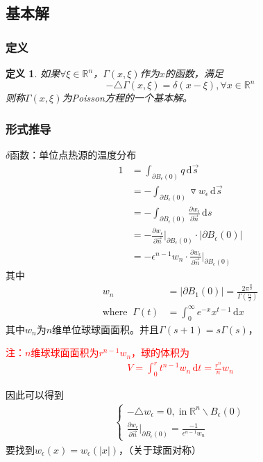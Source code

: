 \documentclass[11pt, a4paper]{article}
\theoremstyle{theorem}
\newtheorem{definition}[thm]{定义}
\newcommand{\intd}[1]{\,\mathrm{d}{#1}}
\begin{document}
\subsection{基本解}

\subsubsection{定义}

\begin{definition}
    如果$\forall \xi \in \mathbb{R}^n$，$\Gamma(x,\xi)$作为$x$的函数，满足
    $$
    - \triangle \Gamma(x,\xi) = \delta(x - \xi), \forall x \in \mathbb{R}^n
    $$
    则称$\Gamma(x,\xi)$为Poisson方程的一个基本解。
\end{definition}

\subsubsection{形式推导}

$\delta$函数：单位点热源的温度分布
\begin{align*}
    1
    &= \int_{\partial B_\epsilon(0)} q \, \mathrm{d} \vec{s} \\
    &= - \int_{\partial B_\epsilon(0)} \triangledown w_\epsilon \, \mathrm{d} \vec{s} \\
    &= - \int_{\partial B_\epsilon(0)} \frac{\partial w_\epsilon}{\partial \vec{n}} \intd s \\
    &= - \frac{\partial w_\epsilon}{\partial \vec{n}} \bigg|_{\partial B_\epsilon(0)} \cdot \left| \partial B_\epsilon(0)\right| \\
    &= - \epsilon^{n-1} w_n \cdot \frac{\partial w_\epsilon}{\partial \vec{n}} \bigg|_{\partial B_\epsilon(0)}
\end{align*}
其中
\begin{align*}
w_n &= |\partial B_1(0)| = \frac{2 \pi^{\frac{n}{2}}}{\Gamma(\frac{n}{2})} \\
\text{where} \; \; \Gamma(t) &= \int_0^\infty e^{-x} x^{t-1} \intd x
\end{align*}
其中$w_n$为$n$维单位球球面面积。并且$\Gamma(s+1) = s \Gamma(s)$，

\textcolor{red}{注：$n$维球球面面积为$r^{n-1} w_n$，球的体积为
\begin{align}
    V = \int_0^r t^{n-1} w_n \intd t = \frac{r^n}{n} w_n
\end{align}
}

因此可以得到
\begin{align}
    \label{Q5-1-1}
    \begin{cases}
        - \triangle w_\epsilon = 0, \; \text{in} \; \mathbb{R}^n \backslash B_\epsilon(0) \\
        \frac{\partial w_\epsilon}{\partial \vec{n}} \bigg|_{\partial B_\epsilon(0)} = \frac{-1}{\epsilon^{n-1}w_n}
    \end{cases}
\end{align}
要找到$w_\epsilon(x) = w_\epsilon(|x|)$，（关于球面对称）
\end{document}
